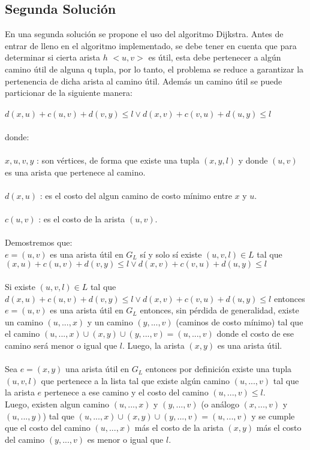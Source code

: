 \documentclass{article}
\begin{document}
\subsection{Segunda Solución}
En una segunda solución se propone el uso del algoritmo Dijkstra. Antes de entrar de lleno en el algoritmo implementado, se debe tener en cuenta que para determinar si cierta arista $h$ $<u,v>$ es útil, esta debe pertenecer a algún camino útil de alguna q tupla, por lo tanto, el problema se reduce a garantizar la pertenencia de dicha arista al camino útil. Además un camino útil se puede particionar de la siguiente manera:
\\
\\
$d(x,u) + c(u,v) + d(v,y) \leq l \vee d(x,v) + c(v,u) + d(u,y) \leq l $
\\
\\
donde:
\\
\\
$x,u,v,y$ : son vértices, de forma que existe una tupla $(x,y,l)$ y donde $(u,v)$ es una arista que pertenece al camino.
\\
\\
$d(x,u)$ : es el costo del algun camino de costo mínimo entre $x$ y $u$.
\\
\\
$c(u,v)$ : es el costo de la arista $(u,v)$.
\\
\\
Demostremos que:
\\
$e = (u,v)$ es una arista útil en $G_{L}$ sí y solo sí existe $(u,v,l) \in L$ tal que $(x,u) + c(u,v) + d(v,y) \leq l \vee d(x,v) + c(v,u) + d(u,y) \leq l$
\\
\\
Si existe $(u,v,l) \in L$ tal que $d(x,u) + c(u,v) + d(v,y) \leq l \vee d(x,v) + c(v,u) + d(u,y) \leq l$ entonces $e = (u,v)$ es una arista útil en $G_{L}$ entonces, sin pérdida de generalidad, existe un camino $(u,...,x)$ y un camino $(y,...,v)$ (caminos de costo mínimo) tal que el camino $(u,...,x) \cup (x,y) \cup (y,...,v) = (u,...,v) $ donde el costo de ese camino será menor o igual que $l$. Luego, la arista $(x,y)$ es una arista útil.
\\
\\
Sea $e = (x,y)$ una arista útil en $G_{L}$ entonces por definición existe una tupla $(u,v,l)$ que pertenece a la lista tal que existe algún camino $(u,...,v)$ tal que la arista $e$ pertenece a ese camino y el costo del camino $(u,...,v) \leq l$.
\\
Luego, existen algun camino $(u,...,x)$ y $(y,...,v)$ (o análogo $(x,...,v)$ y $(u,...,y)$) tal que  $(u,...,x) \cup (x,y) \cup (y,...,v) = (u,...,v) $ y se cumple que el costo del camino $(u,...,x)$ más el costo de la arista $(x,y)$ más el costo del camino $(y,...,v)$ es menor o igual que $l$.
\end{document}
